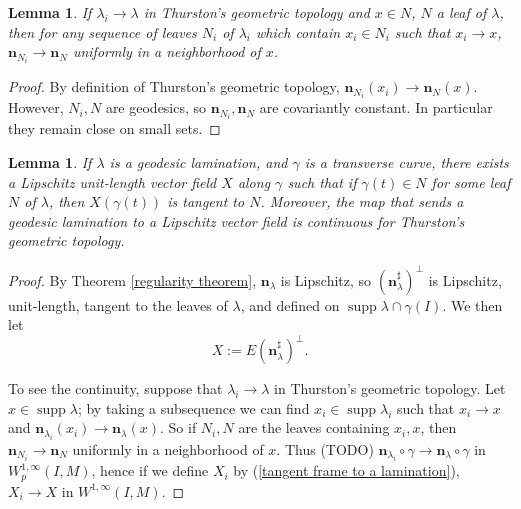 \documentclass[reqno,10pt]{amsart}
\DeclareMathOperator{\supp}{supp}
\newcommand{\normal}{\mathbf n}
\newtheorem{lemma}[theorem]{Lemma}
\theoremstyle{definition}
\numberwithin{equation}{section}
\begin{document}
\begin{lemma}
If $\lambda_i \to \lambda$ in Thurston's geometric topology and $x \in N$, $N$ a leaf of $\lambda$, then for any sequence of leaves $N_i$ of $\lambda_i$ which contain $x_i \in N_i$ such that $x_i \to x$, $\normal_{N_i} \to \normal_N$ uniformly in a neighborhood of $x$.
\end{lemma}
\begin{proof}
By definition of Thurston's geometric topology, $\normal_{N_i}(x_i) \to \normal_N(x)$.
However, $N_i, N$ are geodesics, so $\normal_{N_i}, \normal_N$ are covariantly constant.
In particular they remain close on small sets.
\end{proof}

\begin{lemma}
If $\lambda$ is a geodesic lamination, and $\gamma$ is a transverse curve, there exists a Lipschitz unit-length vector field $X$ along $\gamma$ such that if $\gamma(t) \in N$ for some leaf $N$ of $\lambda$, then $X(\gamma(t))$ is tangent to $N$.
Moreover, the map that sends a geodesic lamination to a Lipschitz vector field is continuous for Thurston's geometric topology.
\end{lemma}
\begin{proof}
By Theorem \ref{regularity theorem}, $\normal_\lambda$ is Lipschitz, so $(\normal_\lambda^\sharp)^\perp$ is Lipschitz, unit-length, tangent to the leaves of $\lambda$, and defined on $\supp \lambda \cap \gamma(I)$.
We then let
\begin{equation}\label{tangent frame to a lamination}
	X := E(\normal_\lambda^\sharp)^\perp.
\end{equation}

To see the continuity, suppose that $\lambda_i \to \lambda$ in Thurston's geometric topology.
Let $x \in \supp \lambda$; by taking a subsequence we can find $x_i \in \supp \lambda_i$ such that $x_i \to x$ and $\normal_{\lambda_i}(x_i) \to \normal_\lambda(x)$.
So if $N_i, N$ are the leaves containing $x_i, x$, then $\normal_{N_i} \to \normal_N$ uniformly in a neighborhood of $x$.
Thus (TODO) $\normal_{\lambda_i} \circ \gamma \to \normal_\lambda \circ \gamma$ in $W^{1, \infty}_p(I, M)$, hence if we define $X_i$ by (\ref{tangent frame to a lamination}), $X_i \to X$ in $W^{1, \infty}(I, M)$.
\end{proof}
\end{document}
